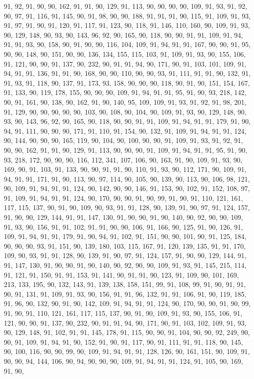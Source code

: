 \begin{sloppypar}
91, 92, 91, 90, 90, 162, 91, 91, 90, 129, 91, 113, 90, 90, 90, 90, 109, 91, 93, 91, 92, 90, 97, 91, 116, 91, 145, 90, 91, 98, 90, 90, 188, 91, 91, 91, 90, 115, 91, 109, 91, 93, 91, 97, 91, 90, 91, 120, 91, 117, 91, 123, 90, 118, 91, 146, 110, 160, 90, 109, 91, 93, 90, 129, 148, 90, 93, 90, 143, 96, 92, 90, 165, 90, 118, 90, 90, 91, 91, 109, 91, 94, 91, 91, 93, 90, 158, 90, 91, 90, 90, 116, 104, 109, 91, 94, 91, 91, 167, 90, 90, 91, 95, 90, 90, 148, 90, 151, 90, 90, 136, 134, 155, 115, 103, 91, 109, 91, 93, 90, 155, 106, 91, 121, 90, 90, 91, 137, 90, 232, 90, 91, 91, 94, 90, 171, 90, 91, 103, 101, 109, 91, 94, 91, 91, 136, 91, 91, 90, 168, 90, 90, 110, 90, 90, 93, 91, 111, 91, 91, 90, 132, 91, 91, 93, 91, 118, 90, 137, 91, 173, 93, 158, 90, 90, 90, 118, 90, 91, 90, 151, 154, 167, 91, 133, 90, 119, 178, 155, 90, 90, 90, 109, 91, 94, 91, 91, 95, 91, 90, 93, 218, 142, 90, 91, 161, 90, 138, 90, 162, 91, 90, 140, 95, 109, 109, 91, 93, 91, 92, 91, 98, 201, 91, 129, 90, 90, 90, 90, 90, 103, 90, 108, 90, 104, 90, 109, 91, 93, 90, 129, 148, 90, 93, 90, 143, 96, 92, 90, 165, 90, 118, 90, 90, 91, 91, 109, 91, 94, 91, 91, 179, 91, 90, 94, 91, 111, 90, 90, 90, 171, 91, 110, 91, 154, 90, 132, 91, 109, 91, 94, 91, 91, 124, 90, 144, 90, 90, 90, 165, 119, 90, 104, 90, 100, 90, 90, 91, 109, 91, 93, 91, 92, 91, 90, 90, 162, 91, 91, 90, 129, 91, 113, 90, 90, 90, 91, 109, 91, 94, 91, 91, 95, 91, 90, 93, 218, 172, 90, 90, 90, 116, 112, 341, 107, 106, 90, 163, 91, 90, 109, 91, 93, 90, 169, 90, 91, 103, 91, 133, 90, 90, 91, 91, 90, 110, 91, 93, 90, 112, 171, 90, 109, 91, 94, 91, 91, 171, 91, 90, 113, 90, 97, 114, 90, 105, 90, 139, 90, 113, 90, 106, 98, 121, 90, 109, 91, 94, 91, 91, 124, 90, 142, 90, 90, 146, 91, 153, 90, 102, 91, 152, 108, 97, 91, 109, 91, 94, 91, 91, 124, 90, 170, 90, 90, 91, 90, 99, 91, 90, 91, 110, 121, 161, 117, 115, 137, 90, 91, 90, 109, 90, 93, 91, 91, 128, 90, 139, 91, 90, 97, 91, 124, 157, 91, 90, 90, 129, 144, 91, 91, 147, 130, 91, 90, 90, 91, 90, 140, 90, 92, 90, 90, 109, 91, 93, 90, 156, 91, 91, 102, 91, 91, 90, 90, 106, 91, 166, 90, 125, 91, 90, 126, 91, 109, 91, 94, 91, 91, 179, 91, 90, 94, 91, 102, 91, 151, 90, 90, 101, 90, 91, 125, 184, 90, 90, 90, 93, 91, 151, 90, 139, 180, 103, 115, 167, 91, 120, 139, 135, 91, 91, 170, 109, 90, 93, 91, 91, 128, 90, 139, 91, 90, 97, 91, 124, 157, 91, 90, 90, 129, 144, 91, 91, 147, 130, 91, 90, 90, 91, 90, 140, 90, 92, 90, 90, 109, 91, 93, 91, 145, 215, 114, 91, 121, 91, 150, 91, 91, 153, 91, 141, 90, 91, 91, 90, 123, 91, 109, 90, 101, 169, 213, 133, 195, 90, 132, 143, 91, 139, 138, 158, 151, 99, 91, 108, 99, 91, 90, 91, 91, 90, 91, 131, 91, 109, 91, 93, 90, 156, 91, 91, 96, 132, 91, 91, 106, 91, 90, 119, 185, 91, 96, 90, 132, 90, 91, 90, 142, 109, 91, 94, 91, 91, 124, 90, 170, 90, 90, 91, 90, 99, 91, 90, 91, 110, 121, 161, 117, 115, 137, 90, 91, 90, 109, 91, 93, 90, 155, 106, 91, 121, 90, 90, 91, 137, 90, 232, 90, 91, 91, 94, 90, 171, 90, 91, 103, 102, 109, 91, 93, 90, 129, 148, 91, 102, 91, 91, 145, 178, 91, 115, 90, 90, 91, 104, 90, 90, 92, 249, 90, 90, 91, 109, 91, 94, 91, 90, 152, 91, 90, 91, 117, 90, 91, 111, 91, 91, 118, 90, 145, 90, 100, 116, 90, 90, 99, 90, 109, 91, 94, 91, 91, 128, 126, 90, 161, 151, 90, 109, 91, 90, 90, 94, 144, 106, 90, 94, 90, 90, 90, 109, 91, 94, 91, 91, 124, 91, 105, 90, 169, 91, 90, 
\end{sloppypar}
